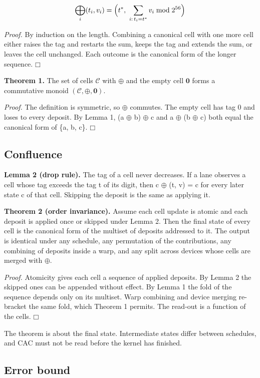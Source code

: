 \documentclass[3p,10pt]{elsarticle}
\begin{document}
\[\bigoplus_i (t_i,v_i)=\Bigl(t^*,\ \sum_{i:\,t_i=t^*} v_i \bmod 2^{56}\Bigr)\]

\emph{Proof.} By induction on the length. Combining a canonical cell
with one more cell either raises the tag and restarts the sum, keeps the
tag and extends the sum, or leaves the cell unchanged. Each outcome is
the canonical form of the longer sequence. \hfill$\mdlgwhtsquare$

\textbf{Theorem 1.} The set of cells \(\mathcal{C}\) with \(\oplus\) and
the empty cell \(\mathbf{0}\) forms a commutative monoid
\((\mathcal{C},\oplus,\mathbf{0})\).

\emph{Proof.} The definition is symmetric, so $\oplus$ commutes. The empty cell
has tag 0 and loses to every deposit. By Lemma 1, (a $\oplus$ b) $\oplus$ c and a $\oplus$ (b
$\oplus$ c) both equal the canonical form of \{a, b, c\}. \hfill$\mdlgwhtsquare$

\hypertarget{confluence}{%
\subsection{Confluence}\label{confluence}}

\textbf{Lemma 2 (drop rule).} The tag of a cell never decreases. If a
lane observes a cell whose tag exceeds the tag t of its digit, then c $\oplus$
(t, v) = c for every later state c of that cell. Skipping the deposit is
the same as applying it.

\textbf{Theorem 2 (order invariance).} Assume each cell update is atomic
and each deposit is applied once or skipped under Lemma 2. Then the
final state of every cell is the canonical form of the multiset of
deposits addressed to it. The output is identical under any schedule,
any permutation of the contributions, any combining of deposits inside a
warp, and any split across devices whose cells are merged with $\oplus$.

\emph{Proof.} Atomicity gives each cell a sequence of applied deposits.
By Lemma 2 the skipped ones can be appended without effect. By Lemma 1
the fold of the sequence depends only on its multiset. Warp combining
and device merging re-bracket the same fold, which Theorem 1 permits.
The read-out is a function of the cells. \hfill$\mdlgwhtsquare$

The theorem is about the final state. Intermediate states differ between
schedules, and CAC must not be read before the kernel has finished.

\hypertarget{error-bound}{%
\subsection{Error bound}\label{error-bound}}
\end{document}
